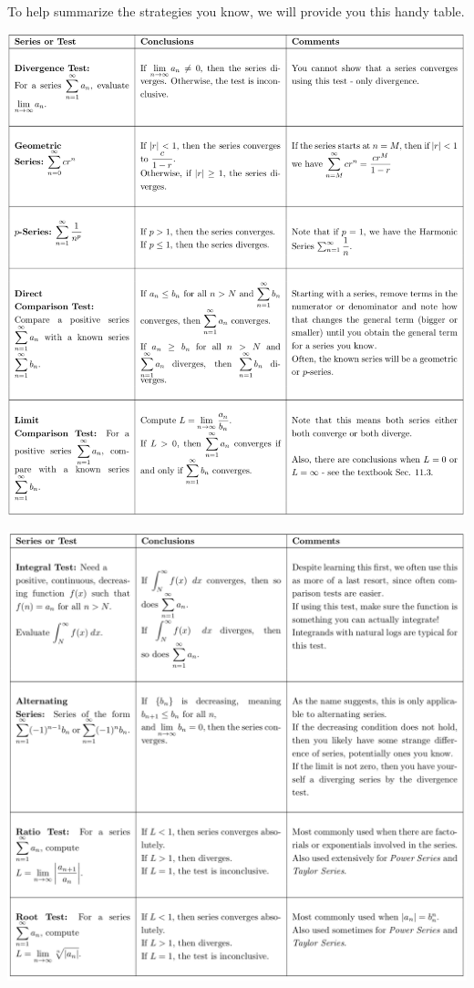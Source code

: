 \documentclass{ximera}
\begin{document}
To help summarize the strategies you know, we will provide you this handy table.

\begin{image}
\includegraphics{Strat_Table1}
\end{image}
\begin{image}
\includegraphics{Strat_Table2}
\end{image}
\end{document}
